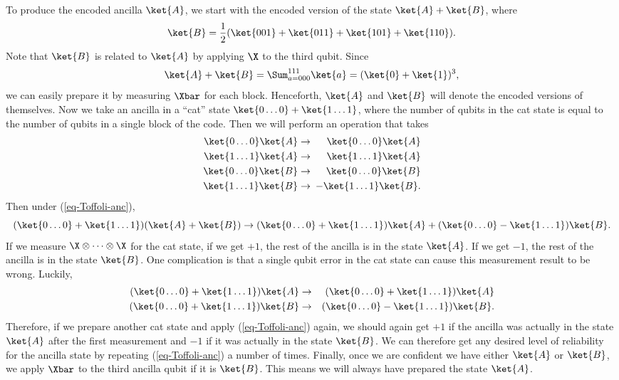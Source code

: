 To produce the encoded ancilla $\ket{A}$, we start with the encoded
version of the state $\ket{A} + \ket{B}$, where
\begin{equation}
	\ket{B} = \frac{1}{2} (\ket{001} + \ket{011} + \ket{101} + \ket{110}).
\end{equation}
Note that $\ket{B}$ is related to $\ket{A}$ by applying $\X$ to the third
qubit.  Since
\begin{equation}
	\ket{A} + \ket{B} = \Sum_{a=000}^{111} \ket{a} = (\ket{0} + \ket{1})^3,
\end{equation}
we can easily prepare it by measuring $\Xbar$ for each block.
Henceforth, $\ket{A}$ and $\ket{B}$ will denote the encoded versions of
themselves.  Now we take an ancilla in a ``cat'' state $\ket{0 \ldots 0} +
\ket{1 \ldots 1}$, where the number of qubits in the cat state is equal to
the number of qubits in a single block of the code.  Then we will perform
an operation that takes
\begin{eqnarray}
	\ket{0 \ldots 0} \ket{A} & \rightarrow & \ket{0 \ldots 0} \ket{A}
	\nonumber \\
	\ket{1 \ldots 1} \ket{A} & \rightarrow & \ket{1 \ldots 1} \ket{A}
	\label{eq-Toffoli-anc} \\
	\ket{0 \ldots 0} \ket{B} & \rightarrow & \ket{0 \ldots 0} \ket{B}
	\nonumber \\
	\ket{1 \ldots 1} \ket{B} & \rightarrow & \!\!\! - \ket{1 \ldots 1} \ket{B}.
	\nonumber
\end{eqnarray}
Then under (\ref{eq-Toffoli-anc}),
\begin{equation}
(\ket{0 \ldots 0} + \ket{1 \ldots 1}) (\ket{A} + \ket{B}) \rightarrow (\ket{0
\ldots 0} + \ket{1 \ldots 1}) \ket{A} + (\ket{0 \ldots 0} - \ket{1 \ldots 1})
\ket{B}.
\end{equation}
If we measure $\X \otimes \cdots \otimes \X$ for the cat state, if we get
$+1$, the rest of the ancilla is in the state $\ket{A}$.  If we get $-1$, the
rest of the ancilla is in the state $\ket{B}$.  One complication is that a
single qubit error in the cat state can cause this measurement result to be
wrong.  Luckily,
\begin{eqnarray}
(\ket{0 \ldots 0} + \ket{1 \ldots 1}) \ket{A} & \rightarrow & (\ket{0 \ldots
0} + \ket{1 \ldots 1}) \ket{A} \\
(\ket{0 \ldots 0} + \ket{1 \ldots 1}) \ket{B} & \rightarrow & (\ket{0 \ldots
0} - \ket{1 \ldots 1}) \ket{B}.
\end{eqnarray}
Therefore, if we prepare another cat state and apply (\ref{eq-Toffoli-anc})
again, we should again get $+1$ if the ancilla was actually in the state
$\ket{A}$ after the first measurement and $-1$ if it was actually in the
state $\ket{B}$.  We can therefore get any desired level of reliability for
the ancilla state by repeating (\ref{eq-Toffoli-anc}) a number of times.
Finally, once we are confident we have either $\ket{A}$ or $\ket{B}$, we
apply $\Xbar$ to the third ancilla qubit if it is $\ket{B}$.  This
means we will always have prepared the state $\ket{A}$.

